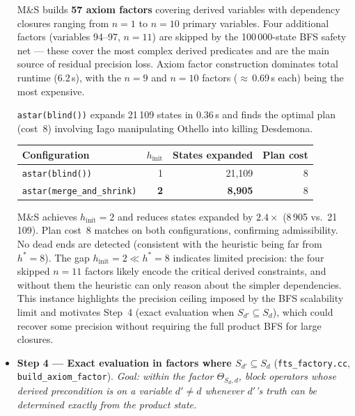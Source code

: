 \documentclass[11pt,a4paper]{article}
\begin{document}
\begin{itemize}
    M\&S builds \textbf{57 axiom factors} covering derived variables with
    dependency closures ranging from $n = 1$ to $n = 10$ primary variables.
    Four additional factors (variables 94--97, $n = 11$) are skipped by
    the 100\,000-state BFS safety net --- these cover the most complex
    derived predicates and are the main source of residual precision loss.
    Axiom factor construction dominates total runtime (6.2\,s), with the
    $n = 9$ and $n = 10$ factors ($\approx$\,0.69\,s each) being the most
    expensive.

    \texttt{astar(blind())} expands 21\,109 states in 0.36\,s and finds
    the optimal plan (cost~8) involving Iago manipulating Othello into
    killing Desdemona.

    \begin{center}
    \begin{tabular}{lrrr}
    \toprule
    \textbf{Configuration} & \textbf{$h_{\mathrm{init}}$}
      & \textbf{States expanded} & \textbf{Plan cost} \\
    \midrule
    \texttt{astar(blind())}            & 1 & 21{,}109 & 8 \\
    \texttt{astar(merge\_and\_shrink)} & \textbf{2} & \textbf{8{,}905}  & 8 \\
    \bottomrule
    \end{tabular}
    \end{center}

    M\&S achieves $h_{\mathrm{init}} = 2$ and reduces states expanded by
    $2.4\times$ (8\,905 vs.\ 21\,109).  Plan cost~8 matches on both
    configurations, confirming admissibility.  No dead ends are detected
    (consistent with the heuristic being far from $h^* = 8$).  The gap
    $h_{\mathrm{init}} = 2 \ll h^* = 8$ indicates limited precision: the
    four skipped $n = 11$ factors likely encode the critical derived
    constraints, and without them the heuristic can only reason about the
    simpler dependencies.  This instance highlights the precision ceiling
    imposed by the BFS scalability limit and motivates Step~4 (exact
    evaluation when $S_{d'} \subseteq S_d$), which could recover some
    precision without requiring the full product BFS for large closures.

  \item \textbf{Step 4 — Exact evaluation in factors where
    $S_{d'} \subseteq S_d$}
    (\texttt{fts\_factory.cc}, \texttt{build\_axiom\_factor}).
    \emph{Goal: within the factor $\Theta_{S_d,d}$, block operators whose
    derived precondition is on a variable $d' \neq d$ whenever $d'$'s truth
    can be determined exactly from the product state.}


\end{itemize}
\end{document}
